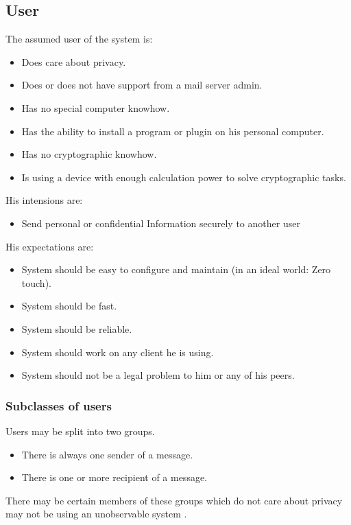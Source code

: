 \documentclass[12pt,journal,compsoc,peerreview]{IEEEtran}
\begin{document}
\subsection{User}
The assumed user of the system is:
\begin{itemize}
	\item Does care about privacy.
	\item Does or does not have support from a mail server admin.
	\item Has no special computer knowhow.
	\item Has the ability to install a program or plugin on his personal computer.
	\item Has no cryptographic knowhow.
	\item Is using a device with enough calculation power to solve cryptographic tasks.
\end{itemize}
His intensions are:
\begin{itemize}
	\item Send personal or confidential Information securely to another user
\end{itemize}
His expectations are:
\begin{itemize}
	\item System should be easy to configure and maintain (in an ideal world: Zero touch). 
	\item System should be fast.
	\item System should be reliable.
	\item System should work on any client he is using.
	\item System should not be a legal problem to him or any of his peers.
\end{itemize}
\subsubsection{Subclasses of users} 
Users may be split into two groups.
\begin{itemize}
	\item There is always one sender of a message.
	\item There is one or more recipient of a message.
\end{itemize}
There may be certain members of these groups which do not care about privacy may not be using an unobservable system .
\end{document}
